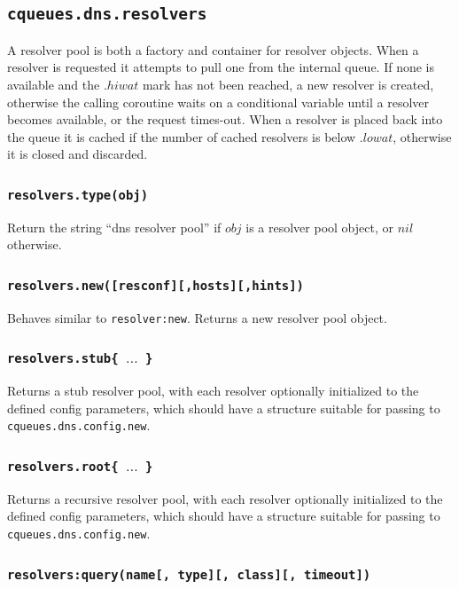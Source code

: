 \documentclass[11pt, oneside]{memoir}
\newcommand*{\routine}[1]{\texttt{#1}\xspace}
\newcommand*{\fn}[1]{\texttt{#1}\xspace}
\newcounter{toccols}
\newenvironment{Module}[1]{
	\subsection{\texttt{#1}}
	\addtocontents{toc}{
		\protect\begin{multicols}{\value{toccols}}
	}
}{
	\addtocontents{toc}{\protect\end{multicols}}
}
\begin{document}
\begin{Module}{cqueues.dns.resolvers}

A resolver pool is both a factory and container for resolver objects. When a resolver is requested it attempts to pull one from the internal queue. If none is available and the $.hiwat$ mark has not been reached, a new resolver is created, otherwise the calling coroutine waits on a conditional variable until a resolver becomes available, or the request times-out. When a resolver is placed back into the queue it is cached if the number of cached resolvers is below $.lowat$, otherwise it is closed and discarded.

\subsubsection[\routine{resolvers.type}]{\routine{resolvers.type(obj)}}
Return the string ``dns resolver pool'' if $obj$ is a resolver pool object, or $nil$ otherwise.

\subsubsection[\fn{resolvers.new}]{\fn{resolvers.new([resconf][,hosts][,hints])}}

Behaves similar to \fn{resolver:new}. Returns a new resolver pool object. 

\subsubsection[\fn{resolvers.stub}]{\fn{resolvers.stub\{ $\ldots$ \}}}

Returns a stub resolver pool, with each resolver optionally initialized to the defined config parameters, which should have a structure suitable for passing to \fn{cqueues.dns.config.new}.

\subsubsection[\fn{resolvers.root}]{\fn{resolvers.root\{ $\ldots$ \}}}

Returns a recursive resolver pool, with each resolver optionally initialized to the defined config parameters, which should have a structure suitable for passing to \fn{cqueues.dns.config.new}.

\subsubsection[\fn{resolvers:query}]{\fn{resolvers:query(name[, type][, class][, timeout])}}


\end{Module}
\end{document}
